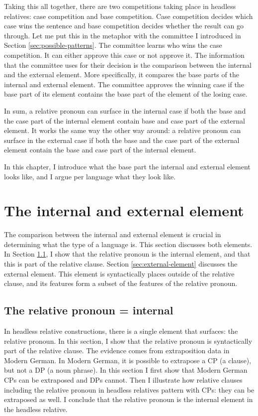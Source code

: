 Taking this all together, there are two competitions taking place in headless relatives: case competition and base competition. Case competition decides which case wins the sentence and base competition decides whether the result can go through. Let me put this in the metaphor with the committee I introduced in Section \ref{sec:possible-patterns}. The committee learns who wins the case competition. It can either approve this case or not approve it. The information that the committee uses for their decision is the comparison between the internal and the external element. More specifically, it compares the base parts of the internal and external element. The committee approves the winning case if the base part of its element contains the base part of the element of the losing case.

In sum, a relative pronoun can surface in the internal case if both the base and the case part of the internal element contain base and case part of the external element. It works the same way the other way around: a relative pronoun can surface in the external case if both the base and the case part of the external element contain the base and case part of the internal element.

In this chapter, I introduce what the base part the internal and external element looks like, and I argue per language what they look like.


\section{The internal and external element}\label{sec:int-ext-elements}

The comparison between the internal and external element is crucial in determining what the type of a language is. This section discusses both elements. In Section \ref{sec:internal-element}, I show that the relative pronoun is the internal element, and that this is part of the relative clause. Section \ref{sec:external-element} discusses the external element. This element is syntactically places outside of the relative clause, and its features form a subset of the features of the relative pronoun.

\subsection{The relative pronoun = internal}\label{sec:internal-element}

In headless relative constructions, there is a single element that surfaces: the relative pronoun. In this section, I show that the relative pronoun is syntactically part of the relative clause. The evidence comes from extraposition data in Modern German. In Modern German, it is possible to extrapose a CP (a clause), but not a DP (a noun phrase). In this section I first show that Modern German CPs can be extraposed and DPs cannot. Then I illustrate how relative clauses including the relative pronoun in headless relatives pattern with CPs: they can be extraposed as well. I conclude that the relative pronoun is the internal element in the headless relative.

